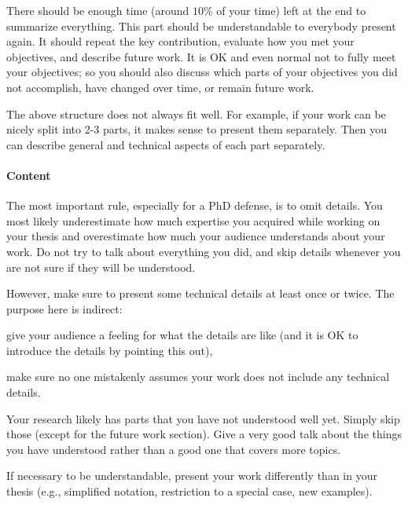 \documentclass[12pt]{article}
\begin{document}
There should be enough time (around $10\%$ of your time) left at the end to summarize everything.
This part should be understandable to everybody present again.
It should repeat the key contribution, evaluate how you met your objectives, and describe future work.
It is OK and even normal not to fully meet your objectives; so you should also discuss which parts of your objectives you did not accomplish, have changed over time, or remain future work.
\medskip

The above structure does not always fit well.
For example, if your work can be nicely split into 2-3 parts, it makes sense to present them separately.
Then you can describe general and technical aspects of each part separately.

\paragraph{Content}
The most important rule, especially for a PhD defense, is to omit details.
You most likely underestimate how much expertise you acquired while working on your thesis and overestimate how much your audience understands about your work.
Do not try to talk about everything you did, and skip details whenever you are not sure if they will be understood.
\medskip

However, make sure to present some technical details at least once or twice.
The purpose here is indirect:
\begin{compactitem}
 \item give your audience a feeling for what the details are like (and it is OK to introduce the details by pointing this out),
 \item make sure no one mistakenly assumes your work does not include any technical details.
\end{compactitem}
\medskip

Your research likely has parts that you have not understood well yet.
Simply skip those (except for the future work section).
Give a very good talk about the things you have understood rather than a good one that covers more topics.

If necessary to be understandable, present your work differently than in your thesis (e.g., simplified notation, restriction to a special case, new examples).
\end{document}
